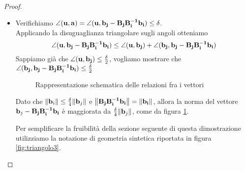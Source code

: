 \documentclass[a4paper,11pt,openright,twoside	]{book}
\begin{document}
\begin{proof}
\begin{itemize}
\item Verifichiamo $ \angle (\vb{u, a})  = \angle (\vb{u} , \vb{b_j - B_j B_i^{-1} b_i} ) \leq \delta $. \\Applicando la disuguaglianza triangolare sugli angoli otteniamo
\begin{equation}
\label{eq:angle}
\angle ( \vb{u} , \vb{b_j - B_j B_i^{-1} b_i} ) \leq \angle (\vb{u} , \vb{b_j}) + \angle(\vb{b_j}, \vb{b_j- B_j B_i^{-1} b_i} ) 
\end{equation}
Sappiamo già che $\angle (\vb{u} , \vb{b_j}) \leq \frac{\delta}{2}$, vogliamo mostrare che $\angle(\vb{b_j}, \vb{b_j- B_j B_i^{-1} b_i} ) \leq \frac{\delta}{2}$
\begin{figure}[!h]
\centering
{}
\caption{Rappresentazione schematica delle relazioni fra i vettori}
\label{fig:palla}
\end{figure} 

Dato che $ \norm{\vb{b}_i} \leq \frac{\delta}{4}\norm{\vb{b}_j}$ e $\norm{\vb{B_j B_i^{-1} b_i}} = \norm{\vb{b_i}}$, allora la norma del vettore $\vb{b}_j - \vb{B_j B_i^{-1} b_i}$ è maggiorata  da $\frac{\delta}{4}\norm{\vb{b}_j}$, come da figura \ref{fig:palla}.

\newpage
Per semplificare la fruibilità della sezione seguente di questa dimostrazione utilizziamo la notazione di geometria sintetica riportata in figura \ref{fig:triangolo3}.


\end{itemize}
\end{proof}
\end{document}
